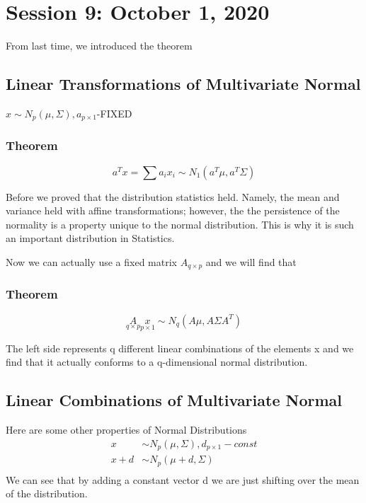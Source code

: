 \chapter{Session 9: October 1, 2020}
\label{tenth}
From last time, we introduced the theorem
\section{Linear Transformations of Multivariate Normal}
$x\sim N_p(\mu,\Sigma),a_{p \times 1}$-FIXED
\subsection{Theorem}
\begin{equation*}
    a^Tx=\sum a_ix_i \sim N_1(a^T\mu,a^T\Sigma)
\end{equation*}

Before we proved that the distribution statistics held. Namely, the mean and variance held with affine transformations; however, the the persistence of the normality is a property unique to the normal distribution. This is why it is such an important distribution in Statistics.

Now we can actually use a fixed matrix $A_{q\times p}$ and we will find that 

\subsection{Theorem}
\begin{equation*}
    \underset{q \times p}{A}
    \underset{p \times 1}{x} \sim N_q(A\mu,A \Sigma A^T)
\end{equation*}

The left side represents q different linear combinations of the elements x and we find that it actually conforms to a q-dimensional normal distribution.

\section{Linear Combinations of Multivariate Normal}
Here are some other properties of Normal Distributions
\begin{align*}
    x &\sim N_p(\mu,\Sigma), d_{p\times 1}-const \\
    x+d &\sim N_p(\mu+d,\Sigma)\\
\end{align*} 
We can see that by adding a constant vector d we are just shifting over the mean of the distribution.

